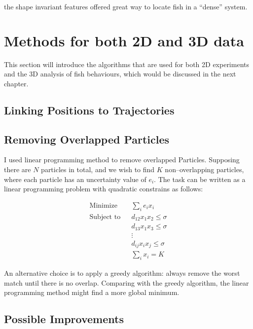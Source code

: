 \documentclass[11pt,twoside]{report}
\begin{document}
the shape invariant features offered great way to locate fish in a ``dense'' system.

\section{Methods for both 2D and 3D data}

This section will introduce the algorithms that are used for both 2D experiments and the 3D analysis of fish behaviours, which would be discussed in the next chapter.

\subsection{Linking Positions to Trajectories}

\subsection{Removing Overlapped Particles}

I used linear programming method to remove overlapped Particles. Supposing there are $N$ particles in total, and we wish to find $K$ non--overlapping particles, where each particle has an uncertainty value of $e_i$. The task can be written as a linear programming problem with quadratic constrains as follows:

\begin{equation}
\begin{aligned}
	\textrm{Minimize} && \sum_i{e_i x_i} \\
	\textrm{Subject to} && d_{12} x_1 x_2 \le \sigma \\
	&& d_{13} x_1 x_3 \le \sigma \\
	&& \vdots  \\
	&& d_{ij} x_i x_j \le \sigma \\
	&& \sum_i{x_i} = K
\end{aligned}
\end{equation}

An alternative choice is to apply a greedy algorithm: always remove the worst match until there is no overlap. Comparing with the greedy algorithm, the linear programming method might find a more global minimum.

\subsection{Possible Improvements}
\end{document}
